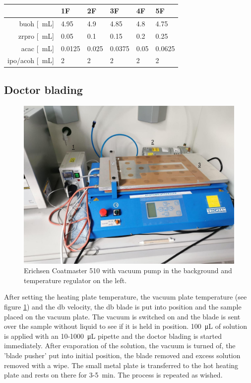 \documentclass[a4paper]{article}
\newcommand{\td}[1]{\textbf{\textcolor{red}{#1}}}
\newcommand{\ml}[1]{\SI{#1}{\milli\liter}}
\newcommand{\ul}[1]{\SI{#1}{\micro\liter}}
\newcommand{\minutes}[1]{\SI{#1}{\minute}}
\begin{document}
\begin{table}[h]
	\centering
	\caption{}
	\label{tab:rec2}
	\begin{tabular}{rlllll}
		\hline
				&1F		&2F		&3F		&4F		&5F		\\
		\hline
		\gls{buoh} [\ml{}]		&4.95	&4.9	&4.85	&4.8	&4.75	\\
		\gls{zrpro} [\ml{}]	&0.05	&0.1	&0.15	&0.2	&0.25	\\
		\gls{acac} [\ml{}]		&0.0125	&0.025	&0.0375	&0.05	&0.0625	\\
		\gls{ipo}/\gls{acoh} [\ml{}]		&2		&2		&2		&2		&2		\\
		\hline
	\end{tabular}
\end{table}

\subsection{Doctor blading}
\label{sec:DB}
\begin{figure}
	\centering
	\includegraphics[width=.8\textwidth]{Pics/erichsen1.png}
	\caption{Erichsen Coatmaster 510 
		with vacuum pump in the background and temperature regulator on the left.}
	\label{fig:eric}
\end{figure}
{After setting the heating plate temperature, the vacuum plate temperature (see figure \ref{fig:eric}) and the \gls{db} velocity, the \gls{db} blade is put into position and the sample placed on the vacuum plate. 
The vacuum is switched on and the blade is sent over the sample without liquid to see if it is held in position.}
\ul{100} of solution is applied with an 10-\ul{1000} pipette and the doctor blading is started immediately. 
After evaporation of the solution, the vacuum is turned of, the 'blade pusher' put into initial position, the blade removed and excess solution removed with a wipe. 
The small metal plate is transferred to the hot heating plate and rests on there for 3-\minutes{5}. 
The process is repeated as wished. 
\end{document}
